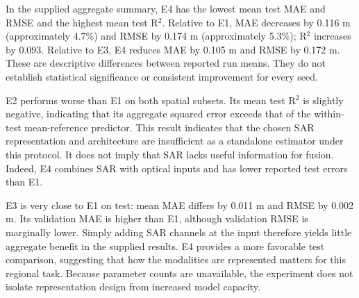 \begin{table}[t]
\centering
\small
\setlength{\tabcolsep}{3pt}
\caption{Provisional aggregate results transcribed from the experiment report. MAE and RMSE are in meters. Validation means are shown without dispersion because the source summaries conflict. Test entries reproduce reported mean $\pm$ standard deviation; seed membership and aggregation require verification against raw logs.}
\end{table}

In the supplied aggregate summary, E4 has the lowest mean test MAE and RMSE and the highest mean test R$^2$. Relative to E1, MAE decreases by 0.116 m (approximately 4.7\%) and RMSE by 0.174 m (approximately 5.3\%); R$^2$ increases by 0.093. Relative to E3, E4 reduces MAE by 0.105 m and RMSE by 0.172 m. These are descriptive differences between reported run means. They do not establish statistical significance or consistent improvement for every seed.

E2 performs worse than E1 on both spatial subsets. Its mean test R$^2$ is slightly negative, indicating that its aggregate squared error exceeds that of the within-test mean-reference predictor. This result indicates that the chosen SAR representation and architecture are insufficient as a standalone estimator under this protocol. It does not imply that SAR lacks useful information for fusion. Indeed, E4 combines SAR with optical inputs and has lower reported test errors than E1.

E3 is very close to E1 on test: mean MAE differs by 0.011 m and RMSE by 0.002 m. Its validation MAE is higher than E1, although validation RMSE is marginally lower. Simply adding SAR channels at the input therefore yields little aggregate benefit in the supplied results. E4 provides a more favorable test comparison, suggesting that how the modalities are represented matters for this regional task. Because parameter counts are unavailable, the experiment does not isolate representation design from increased model capacity.

